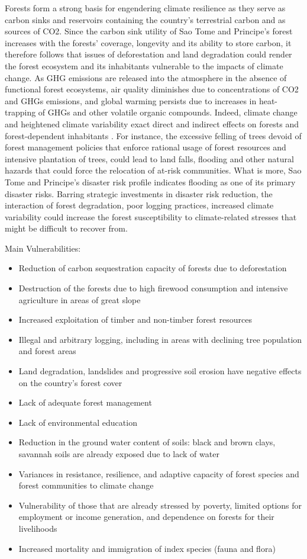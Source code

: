 \documentclass[
]{book}
\providecommand{\tightlist}{%
  \setlength{\itemsep}{0pt}\setlength{\parskip}{0pt}}
\begin{document}
Forests form a strong basis for engendering climate resilience as they serve as carbon sinks and reservoirs containing the country's terrestrial carbon and as sources of CO2. Since the carbon sink utility of Sao Tome and Principe's forest increases with the forests' coverage, longevity and its ability to store carbon, it therefore follows that issues of deforestation and land degradation could render the forest ecosystem and its inhabitants vulnerable to the impacts of climate change. As GHG emissions are released into the atmosphere in the absence of functional forest ecosystems, air quality diminishes due to concentrations of CO2 and GHGs emissions, and global warming persists due to increases in heat-trapping of GHGs and other volatile organic compounds. Indeed, climate change and heightened climate variability exact direct and indirect effects on forests and forest-dependent inhabitants . For instance, the excessive felling of trees devoid of forest management policies that enforce rational usage of forest resources and intensive plantation of trees, could lead to land falls, flooding and other natural hazards that could force the relocation of at-risk communities. What is more, Sao Tome and Principe's disaster risk profile indicates flooding as one of its primary disaster risks. Barring strategic investments in disaster risk reduction, the interaction of forest degradation, poor logging practices, increased climate variability could increase the forest susceptibility to climate-related stresses that might be difficult to recover from.

Main Vulnerabilities:

\begin{itemize}
\tightlist
\item
  Reduction of carbon sequestration capacity of forests due to deforestation
\item
  Destruction of the forests due to high firewood consumption and intensive agriculture in areas of great slope
\item
  Increased exploitation of timber and non-timber forest resources
\item
  Illegal and arbitrary logging, including in areas with declining tree population and forest areas
\item
  Land degradation, landslides and progressive soil erosion have negative effects on the country's forest cover
\item
  Lack of adequate forest management
\item
  Lack of environmental education
\item
  Reduction in the ground water content of soils: black and brown clays, savannah soils are already exposed due to lack of water
\item
  Variances in resistance, resilience, and adaptive capacity of forest species and forest communities to climate change
\item
  Vulnerability of those that are already stressed by poverty, limited options for employment or income generation, and dependence on forests for their livelihoods
\item
  Increased mortality and immigration of index species (fauna and flora)
\end{itemize}
\end{document}
